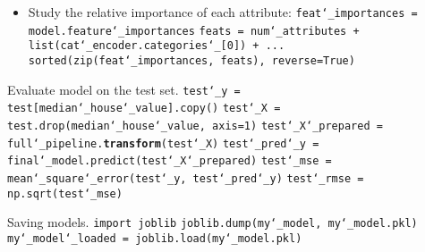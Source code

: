 \begin{itemize}
\item
Study the relative importance of each attribute:\newline
\texttt{feat\char`_importances = model.feature\char`_importances}\newline
\texttt{feats = num\char`_attributes + list(cat\char`_encoder.categories\char`_[0]) + ...}\newline
\texttt{sorted(zip(feat\char`_importances, feats), reverse=True)}
\end{itemize}

Evaluate model on the test set.\newline
\texttt{test\char`_y = test[\textquotesingle median\char`_house\char`_value\textquotesingle].copy()}\newline
\texttt{test\char`_X = test.drop(\textquotesingle median\char`_house\char`_value\textquotesingle, axis=1)}\newline
\texttt{test\char`_X\char`_prepared = full\char`_pipeline.\textbf{transform}(test\char`_X)}\newline
\texttt{test\char`_pred\char`_y = final\char`_model.predict(test\char`_X\char`_prepared)}\newline
\texttt{test\char`_mse = mean\char`_square\char`_error(test\char`_y, test\char`_pred\char`_y)}\newline
\texttt{test\char`_rmse = np.sqrt(test\char`_mse)}\newline

Saving models.\newline
\texttt{import joblib}\newline
\texttt{joblib.dump(my\char`_model, \textquotesingle my\char`_model.pkl\textquotesingle)}\newline
\texttt{my\char`_model\char`_loaded = joblib.load(\textquotesingle my\char`_model.pkl\textquotesingle)}

